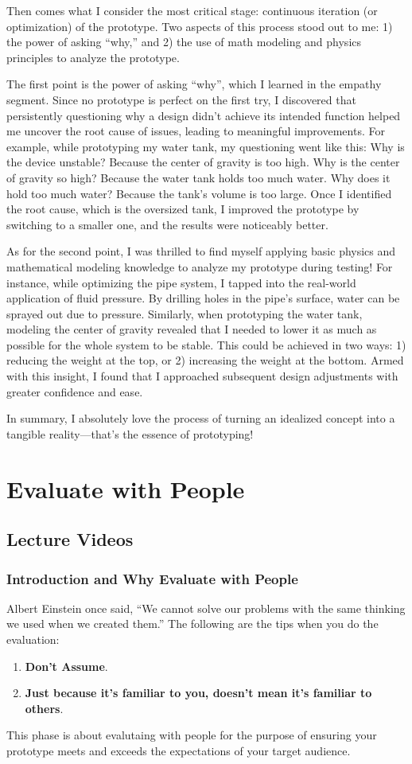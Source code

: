 \documentclass[math,code]{amznotes}
\theoremstyle{remark}
\begin{document}
Then comes what I consider the most critical stage: continuous iteration (or optimization) of the prototype. Two aspects of this process stood out to me: 1) the power of asking “why,” and 2) the use of math modeling and physics principles to analyze the prototype.

The first point is the power of asking “why”, which I learned in the empathy segment. Since no prototype is perfect on the first try, I discovered that persistently questioning why a design didn’t achieve its intended function helped me uncover the root cause of issues, leading to meaningful improvements. For example, while prototyping my water tank, my questioning went like this: Why is the device unstable? Because the center of gravity is too high. Why is the center of gravity so high? Because the water tank holds too much water. Why does it hold too much water? Because the tank’s volume is too large. Once I identified the root cause, which is the oversized tank, I improved the prototype by switching to a smaller one, and the results were noticeably better.

As for the second point, I was thrilled to find myself applying basic physics and mathematical modeling knowledge to analyze my prototype during testing! For instance, while optimizing the pipe system, I tapped into the real-world application of fluid pressure. By drilling holes in the pipe’s surface, water can be sprayed out due to pressure. Similarly, when prototyping the water tank, modeling the center of gravity revealed that I needed to lower it as much as possible for the whole system to be stable. This could be achieved in two ways: 1) reducing the weight at the top, or 2) increasing the weight at the bottom. Armed with this insight, I found that I approached subsequent design adjustments with greater confidence and ease.

In summary, I absolutely love the process of turning an idealized concept into a tangible reality—that’s the essence of prototyping!

\chapter{Evaluate with People}
\section{Lecture Videos}
\subsection{Introduction and Why Evaluate with People}
Albert Einstein once said, ``We cannot solve our problems with the same thinking we used when we created them.'' The following are the tips when you do the evaluation:
\begin{enumerate}
    \item \textbf{Don't Assume}.
    \item \textbf{Just because it's familiar to you, doesn't mean it's familiar to others}.
\end{enumerate}
This phase is about evalutaing with people for the purpose of ensuring your prototype meets and exceeds the expectations of your target audience.
\end{document}
